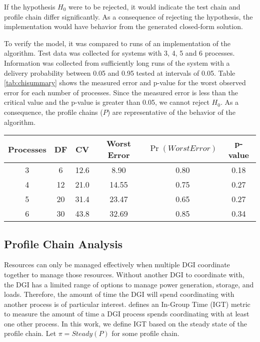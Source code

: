If the hypothesis $H_{0}$ were to be rejected, it would indicate the test chain and profile chain differ significantly.
As a consequence of rejecting the hypothesis, the implementation would have behavior from the generated closed-form solution.

To verify the model, it was compared to runs of an implementation of the algorithm.
Test data was collected for systems with 3, 4, 5 and 6 processes.
Information was collected from sufficiently long runs of the system with a delivery probability between 0.05 and 0.95 tested at intervals of 0.05.
Table \ref{tab:chisummary} shows the measured error and p-value for the worst observed error for each number of processes.
Since the measured error is less than the critical value and the p-value is greater than 0.05, we cannot reject $H_0$. 
As a consequence, the profile chains ($P$) are representative of the behavior of the algorithm.

\begin{table*}[!t]
\centering
\caption{Summary of $\chi^2$ tests performed.}
\begin{tabular}{ c | c c c c c}
  \hline
  Processes & DF & CV & Worst Error & $\Pr(WorstError)$ &  p-value \\ \hline
  3 & 6 & 12.6 & 8.90 & 0.80 & 0.18 \\
  4 & 12 & 21.0 & 14.55 & 0.75 & 0.27 \\
  5 & 20 & 31.4 & 23.47 & 0.65 & 0.27 \\
  6 & 30 & 43.8 & 32.69 & 0.85 & 0.34 \\
\end{tabular}

\label{tab:chisummary}
\end{table*}

\subsection{Profile Chain Analysis}

Resources can only be managed effectively when multiple \ac{DGI} coordinate together to manage those resources.
Without another DGI to coordinate with, the DGI has a limited range of options to manage power generation, storage, and loads.
Therefore, the amount of time the DGI will spend coordinating with another process is of particular interest.
\cite{CRITIS2012} defines an In-Group Time (IGT) metric to measure the amount of time a DGI process spends coordinating with at least one other process.
In this work, we define \ac{IGT} based on the steady state of the profile chain.
Let $\pi=Steady(P)$ for some profile chain.

